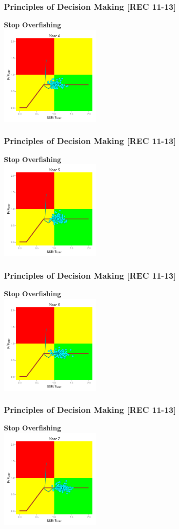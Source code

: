 \begin{frame}\frametitle{Principles of Decision Making [REC 11-13]} \smallskip\textbf{Stop Overfishing}\smallskip\\ \includegraphics[height=50mm,width=50mm]{hcrI5.png}\end{frame}
\begin{frame}\frametitle{Principles of Decision Making [REC 11-13]} \smallskip\textbf{Stop Overfishing}\smallskip\\ \includegraphics[height=50mm,width=50mm]{hcrI6.png}\end{frame}
\begin{frame}\frametitle{Principles of Decision Making [REC 11-13]} \smallskip\textbf{Stop Overfishing}\smallskip\\ \includegraphics[height=50mm,width=50mm]{hcrI7.png}\end{frame}
\begin{frame}\frametitle{Principles of Decision Making [REC 11-13]} \smallskip\textbf{Stop Overfishing}\smallskip\\ \includegraphics[height=50mm,width=50mm]{hcrI8.png}\end{frame}
